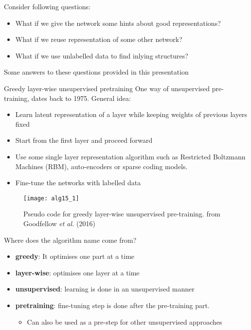 \begin{frame}
Consider following questions:
\begin{itemize}
\item What if we give the network some hints about good representations?
\item What if we reuse representation of some other network?
\item What if we use unlabelled data to find inlying structures?
\end{itemize}
Some answers to these questions provided in this presentation
\end{frame}

\begin{frame}{Greedy layer-wise unsupervised pretraining}
One way of unsupervised pre-training, dates back to 1975. General idea:
\begin{itemize}
\item Learn latent representation of a layer while keeping weights of previous layers fixed
\item Start from the first layer and proceed forward
\item Use some single layer representation algorithm such as Restricted Boltzmann Machines (RBM), auto-encoders or sparse coding models.
\item Fine-tune the networks with labelled data
\end{itemize}
\end{frame}

\begin{frame}
\begin{figure}[t]
\centering
\texttt{[image: alg15\_1]} %
\caption{Pseudo code for greedy layer-wise unsupervised pre-training. from Goodfellow \textit{et al.} (2016)}
\end{figure}
\end{frame}

\begin{frame}
Where does the algorithm name come from?
\begin{itemize}
\item{\bf greedy}: It optimises one part at a time
\item{\bf layer-wise}: optimises one layer at a time
\item{\bf unsupervised}: learning is done in an unsupervised manner
\item{\bf pretraining}: fine-tuning step is done after the pre-training part. 
\begin{itemize}
\item Can also be used as a pre-step for other unsupervised approaches 
\end{itemize}
\end{itemize}
\end{frame}

